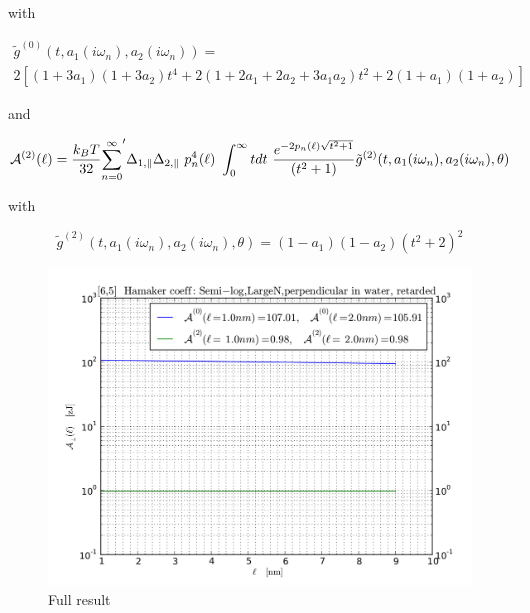 \documentclass[a4paper]{article}
\begin{document}
\begin{center}
with

\begin{multline*}
\tilde g^{(0)}(t, a_1(i \omega_n), a_2(i \omega_n)) = \\ 
2 \left[ (1+3a_1)(1+3a_2) t^{4} + 2 (1+2a_1+2a_2+3a_1a_2) t^{2}  + 2(1+a_1)(1+a_2)\right]
\end{multline*}


and

\begin{equation}
{\cal A}^{(2)}(\ell) = \frac{k_BT}{32}  {\sum_{n=0}^{\infty}}' \Delta_{1,\parallel} \Delta_{2,\parallel} ~p_n^{4}(\ell) ~\int_0^{\infty} t dt ~\frac{e^{- 2 p_n(\ell) \sqrt{t^{2} + 1}}}{(t^{2} + 1)} \tilde g^{(2)}(t, a_1(i \omega_n), a_2(i \omega_n), \theta)
\end{equation}

with

\begin{equation}
\tilde g^{(2)}(t, a_1(i \omega_n), a_2(i \omega_n), \theta) = (1-a_1)(1-a_2)(t^{2} + 2)^2
\label{befgqw}
\end{equation}

\begin{figure}[t!]
\begin{center}
\includegraphics[width=1.2\textwidth]{large_N/140322_65w65_HCs_semilog_perpendicular_ret_lrg_n.png}
\hskip 43pt
\caption{Full result}
\label{eiz65}
\end{center}
\end{figure} 


\end{center}
\end{document}

